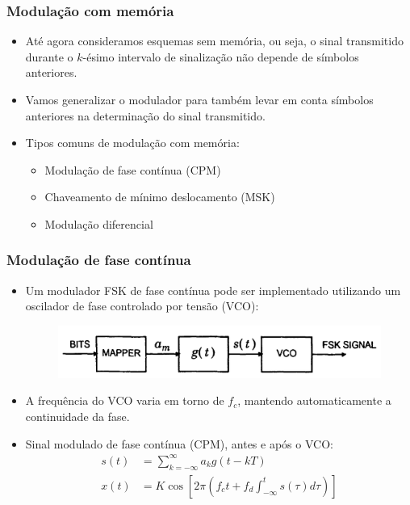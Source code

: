 \begin{frame}
	\frametitle{Modulação com memória}

	\begin{itemize}
	    \item Até agora consideramos esquemas sem memória, ou seja, o sinal transmitido durante o $k$-ésimo intervalo de sinalização não depende de símbolos anteriores.
	    \item Vamos generalizar o modulador para também levar em conta símbolos anteriores na determinação do sinal transmitido.
	    \item Tipos comuns de modulação com memória:
	    \begin{itemize}
		\item Modulação de fase contínua (CPM)
		\item Chaveamento de mínimo deslocamento (MSK)
		\item Modulação diferencial
	    \end{itemize}
	\end{itemize}	
\end{frame}

\begin{frame}
	\frametitle{Modulação de fase contínua}

	\begin{itemize}
	    \item Um modulador FSK de fase contínua pode ser implementado utilizando um oscilador de fase controlado por tensão (VCO):
	    \begin{figure}[t]	
		\begin{center}
		\includegraphics[width=0.7\columnwidth]{figs/adv_23}
		\end{center}
	    \end{figure}
	    \item A frequência do VCO varia em torno de $f_c$, mantendo automaticamente a continuidade da fase.
	    \item Sinal modulado de fase contínua (CPM), antes e após o VCO:
	    \begin{align*}
		 s(t) &= \sum_{k=-\infty}^{\infty} a_k g(t-kT) \\
		 x(t) &= K \cos\left[2\pi \left( f_c t + f_d \int_{-\infty}^t s(\tau) d\tau \right) \right]
	    \end{align*}
	\end{itemize}	
\end{frame}

